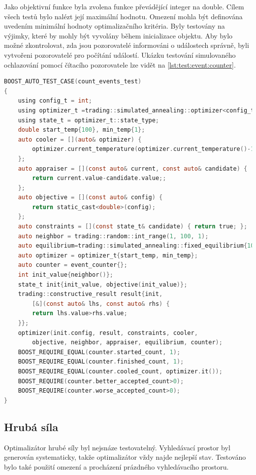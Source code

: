 Jako objektivní funkce byla zvolena funkce převádějící integer na double.
Cílem všech testů bylo nalézt její maximální hodnotu.
Omezení mohla být definována uvedením minimální hodnoty optimalizačního kritéria.
Byly testovány na výjimky, které by mohly být vyvolány během inicializace objektu.
Aby bylo možné zkontrolovat, zda jsou pozorovatelé informováni o událostech správně, byli vytvořeni pozorovatelé pro počítání událostí.
Ukázku testování simulovaného ochlazování pomocí čítacího pozorovatele lze vidět na \ref{lst:test:event:counter}.

\begin{lstlisting}[caption={~Testování optimalizátoru pomocí pozorovatele},label={lst:test:event:counter},captionpos=t,abovecaptionskip=-\medskipamount,belowcaptionskip=\medskipamount,language=C]
BOOST_AUTO_TEST_CASE(count_events_test)
{
    using config_t = int;
    using optimizer_t =trading::simulated_annealing::optimizer<config_t>;
    using state_t = optimizer_t::state_type;
    double start_temp{100}, min_temp{1};
    auto cooler = [](auto& optimizer) {
        optimizer.current_temperature(optimizer.current_temperature()-1);
    };
    auto appraiser = [](const auto& current, const auto& candidate) {
        return current.value-candidate.value;;
    };
    auto objective = [](const auto& config) {
        return static_cast<double>(config);
    };
    auto constraints = [](const state_t& candidate) { return true; };
    auto neighbor = trading::random::int_range(1, 100, 1);
    auto equilibrium=trading::simulated_annealing::fixed_equilibrium{10};
    auto optimizer = optimizer_t{start_temp, min_temp};
    auto counter = event_counter{};
    int init_value{neighbor()};
    state_t init{init_value, objective(init_value)};
    trading::constructive_result result{init,
        [&](const auto& lhs, const auto& rhs) {
        return lhs.value>rhs.value;
    }};
    optimizer(init.config, result, constraints, cooler,
        objective, neighbor, appraiser, equilibrium, counter);
    BOOST_REQUIRE_EQUAL(counter.started_count, 1);
    BOOST_REQUIRE_EQUAL(counter.finished_count, 1);
    BOOST_REQUIRE_EQUAL(counter.cooled_count, optimizer.it());
    BOOST_REQUIRE(counter.better_accepted_count>0);
    BOOST_REQUIRE(counter.worse_accepted_count>0);
}
\end{lstlisting}

\subsection{Hrubá síla}
Optimalizátor hrubé síly byl nejsnáze testovatelný.
Vyhledávací prostor byl generován systematicky, takže optimalizátor vždy najde nejlepší stav.
Testováno bylo také použití omezení a procházení prázdného vyhledávacího prostoru.

